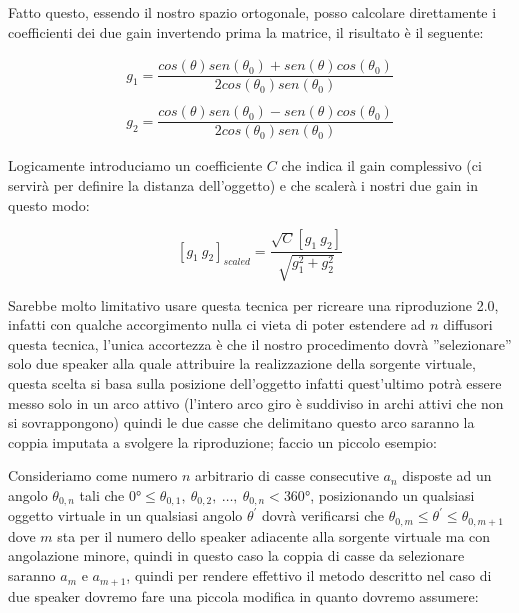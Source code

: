 \documentclass[12pt,a4paper]{report}
\begin{document}
Fatto questo, essendo il nostro spazio ortogonale, posso calcolare direttamente i coefficienti dei due gain invertendo prima la matrice, il risultato è il seguente:

\begin{equation}\begin{split}
g_1=\dfrac{cos(\theta) sen(\theta_0) + sen (\theta) cos(\theta_0)}{2 cos(\theta_0) sen(\theta_0)}\\ \\
g_2=\dfrac{cos(\theta) sen(\theta_0) - sen (\theta) cos(\theta_0)}{2 cos(\theta_0) sen(\theta_0)}
\end{split}
\label{eq:eeee}
\end{equation}

Logicamente introduciamo un coefficiente $C$ che indica il gain complessivo (ci servirà per definire la distanza dell'oggetto) e che scalerà i nostri due gain in questo modo:

\begin{equation}
\left[g_1 \ g_2\right]_{scaled} = \dfrac{\sqrt{C} \left[ g_1 \ g_2 \right]}{\sqrt{g_1^2 + g_2^2}}
\label{eq:ffff}
\end{equation}

Sarebbe molto limitativo usare questa tecnica per ricreare una riproduzione 2.0, infatti con qualche accorgimento nulla ci vieta di poter estendere ad $n$ diffusori questa tecnica, l'unica accortezza è che il nostro procedimento dovrà ''selezionare'' solo due speaker alla quale attribuire la realizzazione della sorgente virtuale, questa scelta si basa sulla posizione dell'oggetto infatti quest'ultimo potrà essere messo solo in un arco attivo (l'intero arco giro è suddiviso in archi attivi che non si sovrappongono) quindi le due casse che delimitano questo arco saranno la coppia imputata a svolgere la riproduzione; faccio un piccolo esempio:

Consideriamo come numero $n$ arbitrario di casse consecutive $a_n$ disposte ad un angolo $\theta_{0,n}$ tali che $0°\leq \theta_{0,1},\ \theta_{0,2},\ \ldots,\ \theta_{0,n} <360°$, posizionando un qualsiasi oggetto virtuale in un qualsiasi angolo $\theta^{\prime}$ dovrà verificarsi che $\theta_{0,m}\leq \theta^{\prime} \leq \theta_{0,m+1}$ dove $m$ sta per il numero dello speaker adiacente alla sorgente virtuale ma con angolazione minore, quindi in questo caso la coppia di casse da selezionare saranno $a_m$ e $a_{m+1}$, quindi per rendere effettivo il metodo descritto nel caso di due speaker dovremo fare una piccola modifica in quanto dovremo assumere:
\end{document}
